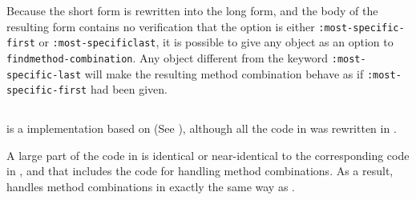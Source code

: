 Because the short form is rewritten into the long form, and the body
of the resulting form contains no verification that the option is
either \texttt{:most-specific-first} or \texttt{:most-specific\-last},
it is possible to give any object as an option to
\texttt{find\-method-combination}.  Any object different from the
keyword \texttt{:most-specific-last} will make the resulting method
combination behave as if \texttt{:most-specific-first} had been given.

\subsection{\clasp{}}

\clasp{} \cite{Schafmeister:Clasp}
is a \commonlisp{} implementation based on \ecl{} (See
), although all the \clanguage{} code in \ecl{} was
rewritten in \cplusplus{}.

A large part of the \commonlisp{} code in \clasp{} is identical or
near-identical to the corresponding code in \ecl{}, and that includes
the code for handling method combinations.  As a result, \clasp{}
handles method combinations in exactly the same way as \ecl{}.
